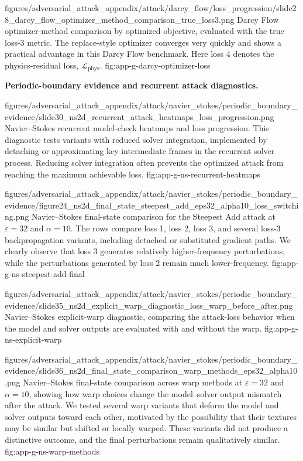 \documentclass[letterpaper]{article} %
\newcounter{appendixsection}
\newcounter{appendixsubsection}[appendixsection]
\newcounter{appendixdomain}[appendixsubsection]
\begin{document}
\appendixattackfigstacked
  {figures/adversarial_attack_appendix/attack/darcy_flow/loss_progression/slide28_darcy_flow_optimizer_method_comparison_true_loss3.png}
  {Darcy Flow optimizer-method comparison by optimized objective, evaluated
  with the true loss-3 metric. The replace-style optimizer converges very
  quickly and shows a practical advantage in this Darcy Flow benchmark. Here
  loss 4 denotes the physics-residual loss, $\mathcal{L}_{\mathrm{phys}}$.}
  {fig:app-g-darcy-optimizer-loss}

\FloatBarrier
{}

\noindent\textbf{Periodic-boundary evidence and recurrent attack diagnostics.}

\appendixattackfigstacked
  {figures/adversarial_attack_appendix/attack/navier_stokes/periodic_boundary_evidence/slide30_ns2d_recurrent_attack_heatmaps_loss_progression.png}
  {Navier--Stokes recurrent model-check heatmaps and loss progression. This
  diagnostic tests variants with reduced solver integration, implemented by
  detaching or approximating key intermediate frames in the recurrent solver
  process. Reducing solver integration often prevents the optimized attack from
  reaching the maximum achievable loss.}
  {fig:app-g-ns-recurrent-heatmaps}

\appendixattackfigfullportrait
  {figures/adversarial_attack_appendix/attack/navier_stokes/periodic_boundary_evidence/figure24_ns2d_final_state_steepest_add_eps32_alpha10_loss_switching.png}
  {Navier--Stokes final-state comparison for the Steepest Add attack at
  $\varepsilon=32$ and $\alpha=10$. The rows compare loss 1, loss 2, loss 3, and
  several loss-3 backpropagation variants, including detached or substituted
  gradient paths. We clearly observe that loss 3 generates relatively
  higher-frequency perturbations, while the perturbations generated by loss 2
  remain much lower-frequency.}
  {fig:app-g-ns-steepest-add-final}

\appendixattackfigportraitwidelarge
  {figures/adversarial_attack_appendix/attack/navier_stokes/periodic_boundary_evidence/slide35_ns2d_explicit_warp_diagnostic_loss_warp_before_after.png}
  {Navier--Stokes explicit-warp diagnostic, comparing the attack-loss behavior when
  the model and solver outputs are evaluated with and without the warp.}
  {fig:app-g-ns-explicit-warp}

\appendixattackfigportraitwidelarge
  {figures/adversarial_attack_appendix/attack/navier_stokes/periodic_boundary_evidence/slide36_ns2d_final_state_comparison_warp_methods_eps32_alpha10.png}
  {Navier--Stokes final-state comparison across warp methods at $\varepsilon=32$
  and $\alpha=10$, showing how warp choices change the model--solver output
  mismatch after the attack. We tested several warp variants that deform the
  model and solver outputs toward each other, motivated by the possibility that
  their textures may be similar but shifted or locally warped. These variants
  did not produce a distinctive outcome, and the final perturbations remain
  qualitatively similar.}
  {fig:app-g-ns-warp-methods}
\end{document}
